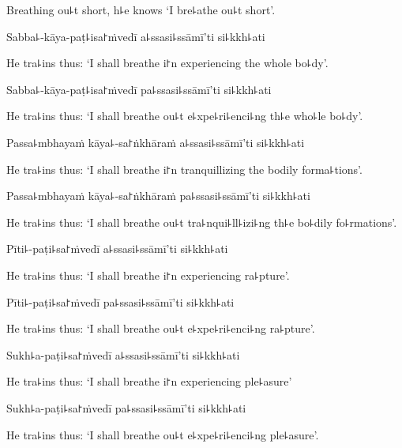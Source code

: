 \begin{english}
  Breathing ou꜕t short, h꜕e knows `I bre꜕athe ou꜕t short'.
\end{english}

Sabba꜕-kāya-paṭ꜕isa꜓ṁvedī a꜕ssasi꜕ssāmī'ti si꜕kkh꜕ati

\begin{english}
  He tra꜕ins thus: `I shall breathe i꜓n experiencing the whole bo꜕dy'.
\end{english}

Sabba꜕-kāya-paṭ꜕isa꜓ṁvedī pa꜕ssasi꜕ssāmī'ti si꜕kkh꜕ati

\begin{english}
  He tra꜕ins thus: `I shall breathe ou꜕t e꜕xpe꜕ri꜕enci꜕ng th꜕e who꜕le bo꜕dy'.
\end{english}

Passa꜕mbhayaṁ kāya꜕-sa꜓ṅkhāraṁ a꜕ssasi꜕ssāmī'ti si꜕kkh꜕ati

\begin{english}
  He tra꜕ins thus: `I shall breathe i꜓n tranquillizing the bodily forma꜕tions'.
\end{english}

Passa꜕mbhayaṁ kāya꜕-sa꜓ṅkhāraṁ pa꜕ssasi꜕ssāmī'ti si꜕kkh꜕ati

\begin{english}
  He tra꜕ins thus: `I shall breathe ou꜕t tra꜕nqui꜕ll꜕izi꜕ng th꜕e bo꜕dily fo꜕rmations'.
\end{english}

Pīti꜕-paṭi꜕sa꜓ṁvedī a꜕ssasi꜕ssāmī'ti si꜕kkh꜕ati

\begin{english}
  He tra꜕ins thus: `I shall breathe i꜓n experiencing ra꜕pture'.
\end{english}

Pīti꜕-paṭi꜕sa꜓ṁvedī pa꜕ssasi꜕ssāmī'ti si꜕kkh꜕ati

\begin{english}
  He tra꜕ins thus: `I shall breathe ou꜕t e꜕xpe꜕ri꜕enci꜕ng ra꜕pture'.
\end{english}

Sukh꜕a-paṭi꜕sa꜓ṁvedī a꜕ssasi꜕ssāmī'ti si꜕kkh꜕ati

\begin{english}
  He tra꜕ins thus: `I shall breathe i꜓n experiencing ple꜕asure'
\end{english}

Sukh꜕a-paṭi꜕sa꜓ṁvedī pa꜕ssasi꜕ssāmī'ti si꜕kkh꜕ati

\begin{english}
  He tra꜕ins thus: `I shall breathe ou꜕t e꜕xpe꜕ri꜕enci꜕ng ple꜕asure'.
\end{english}

